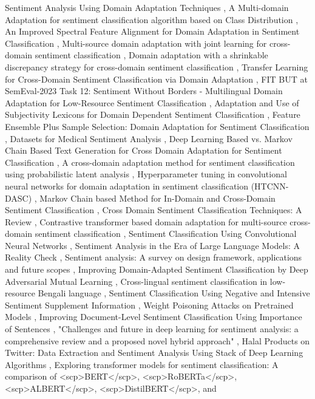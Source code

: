 \documentclass{article}
\begin{document}
Sentiment Analysis Using Domain Adaptation Techniques \cite{toms2025multidomain33316bb2}, A Multi-domain Adaptation for sentiment classification algorithm based on Class Distribution \cite{hu2012multidomainbcc75de0}, An Improved Spectral Feature Alignment for Domain Adaptation in Sentiment Classification \cite{huang2019improveda508c460}, Multi-source domain adaptation with joint learning for cross-domain sentiment classification \cite{zhao2020multisource7b0cdd65}, Domain adaptation with a shrinkable discrepancy strategy for cross-domain sentiment classification \cite{fu2022domain8bfe3f26}, Transfer Learning for Cross-Domain Sentiment Classification via Domain Adaptation \cite{singh2025transfer1f0335ee}, FIT BUT at SemEval-2023 Task 12: Sentiment Without Borders - Multilingual Domain Adaptation for Low-Resource Sentiment Classification \cite{aparovich2023fitc3d3d015}, Adaptation and Use of Subjectivity Lexicons for Domain Dependent Sentiment Classification \cite{dehkharghani2012adaptation0425a16e}, Feature Ensemble Plus Sample Selection: Domain Adaptation for Sentiment Classification \cite{xia2013feature0e6c6b6d}, Datasets for Medical Sentiment Analysis \cite{denecke2023datasets03b63e0c}, Deep Learning Based vs. Markov Chain Based Text Generation for Cross Domain Adaptation for Sentiment Classification \cite{abdelwahab2018deep9757ef1c}, A cross-domain adaptation method for sentiment classification using probabilistic latent analysis \cite{gao2011crossdomainf0de5e2c}, Hyperparameter tuning in convolutional neural networks for domain adaptation in sentiment classification (HTCNN-DASC) \cite{krishnakumari2019hyperparameter922e22d8}, Markov Chain based Method for In-Domain and Cross-Domain Sentiment Classification \cite{domeniconi2015markov6c95be6c}, Cross Domain Sentiment Classification Techniques: A Review \cite{kadli2019cross469bc0a0}, Contrastive transformer based domain adaptation for multi-source cross-domain sentiment classification \cite{fu2022contrastivee139263a}, Sentiment Classification Using Convolutional Neural Networks \cite{kim2019sentiment615c3ca2}, Sentiment Analysis in the Era of Large Language Models: A Reality Check \cite{zhang2024sentimentc6eb6828}, Sentiment analysis: A survey on design framework, applications and future scopes \cite{bordoloi2023sentimentdb283d12}, Improving Domain-Adapted Sentiment Classification by Deep Adversarial Mutual Learning \cite{xue2020improvingdba2f6c5}, Cross-lingual sentiment classification in low-resource Bengali language \cite{sazzed2020crosslingual181c8ce3}, Sentiment Classification Using Negative and Intensive Sentiment Supplement Information \cite{chen2019sentimente5e5b9d2}, Weight Poisoning Attacks on Pretrained Models \cite{kurita2020weight048d91fe}, Improving Document-Level Sentiment Classification Using Importance of Sentences \cite{choi2020improving432d296c}, "Challenges and future in deep learning for sentiment analysis: a comprehensive review and a proposed novel hybrid approach" \cite{islam2024challenges02fd95a5}, Halal Products on Twitter: Data Extraction and Sentiment Analysis Using Stack of Deep Learning Algorithms \cite{feizollah2019halalf402d6f1}, Exploring transformer models for sentiment classification: A comparison of <scp>BERT</scp>, <scp>RoBERTa</scp>, <scp>ALBERT</scp>, <scp>DistilBERT</scp>, and 
\end{document}
